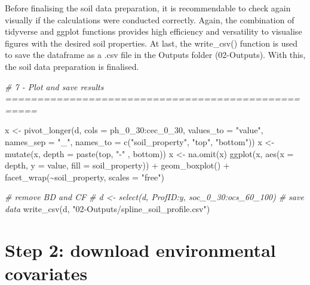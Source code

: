 \documentclass[
  10pt,
  b5paper,
  oneside]{book}
\newenvironment{Shaded}{\begin{snugshade}}{\end{snugshade}}
\newcommand{\AttributeTok}[1]{\textcolor[rgb]{0.77,0.63,0.00}{#1}}
\newcommand{\CommentTok}[1]{\textcolor[rgb]{0.56,0.35,0.01}{\textit{#1}}}
\newcommand{\FunctionTok}[1]{\textcolor[rgb]{0.00,0.00,0.00}{#1}}
\newcommand{\NormalTok}[1]{#1}
\newcommand{\OtherTok}[1]{\textcolor[rgb]{0.56,0.35,0.01}{#1}}
\newcommand{\SpecialCharTok}[1]{\textcolor[rgb]{0.00,0.00,0.00}{#1}}
\newcommand{\StringTok}[1]{\textcolor[rgb]{0.31,0.60,0.02}{#1}}
\begin{document}
Before finalising the soil data preparation, it is recommendable to check again visually if the calculations were conducted correctly. Again, the combination of tidyverse and ggplot functions provides high efficiency and versatility to visualise figures with the desired soil properties. At last, the write\_csv() function is used to save the dataframe as a .csv file in the Outputs folder (02-Outputs). With this, the soil data preparation is finalised.

\begin{Shaded}
\begin{Highlighting}[]
\CommentTok{\# 7 {-} Plot  and save results ===================================================}

\NormalTok{x }\OtherTok{\textless{}{-}} \FunctionTok{pivot\_longer}\NormalTok{(d, }\AttributeTok{cols =}\NormalTok{ ph\_0\_30}\SpecialCharTok{:}\NormalTok{cec\_0\_30, }\AttributeTok{values\_to =} \StringTok{"value"}\NormalTok{,}
                  \AttributeTok{names\_sep =} \StringTok{"\_"}\NormalTok{, }
                  \AttributeTok{names\_to =} \FunctionTok{c}\NormalTok{(}\StringTok{"soil\_property"}\NormalTok{, }\StringTok{"top"}\NormalTok{, }\StringTok{"bottom"}\NormalTok{))}
\NormalTok{x }\OtherTok{\textless{}{-}} \FunctionTok{mutate}\NormalTok{(x, }\AttributeTok{depth =} \FunctionTok{paste}\NormalTok{(top, }\StringTok{"{-}"}\NormalTok{ , bottom))}
\NormalTok{x }\OtherTok{\textless{}{-}} \FunctionTok{na.omit}\NormalTok{(x)}
\FunctionTok{ggplot}\NormalTok{(x, }\FunctionTok{aes}\NormalTok{(}\AttributeTok{x =}\NormalTok{ depth, }\AttributeTok{y =}\NormalTok{ value, }\AttributeTok{fill =}\NormalTok{ soil\_property)) }\SpecialCharTok{+}
  \FunctionTok{geom\_boxplot}\NormalTok{() }\SpecialCharTok{+} 
  \FunctionTok{facet\_wrap}\NormalTok{(}\SpecialCharTok{\textasciitilde{}}\NormalTok{soil\_property, }\AttributeTok{scales =} \StringTok{"free"}\NormalTok{)}

\CommentTok{\# remove BD and CF}
\CommentTok{\# d \textless{}{-} select(d, ProfID:y, soc\_0\_30:ocs\_60\_100)}
\CommentTok{\# save data}
\FunctionTok{write\_csv}\NormalTok{(d, }\StringTok{"02{-}Outputs/spline\_soil\_profile.csv"}\NormalTok{)}
\end{Highlighting}
\end{Shaded}

\hypertarget{step-2-download-environmental-covariates}{%
\chapter{Step 2: download environmental covariates}\label{step-2-download-environmental-covariates}}
\end{document}
